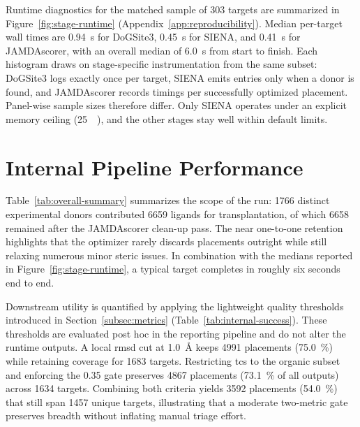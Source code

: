 

Runtime diagnostics for the matched sample of \num{303} targets are summarized in Figure~\ref{fig:stage-runtime} (Appendix~\ref{app:reproducibility}). Median per-target wall times are \SI{0.94}{\second} for DoGSite3, \SI{0.45}{\second} for SIENA, and \SI{0.41}{\second} for JAMDAscorer, with an overall median of \SI{6.0}{\second} from start to finish. Each histogram draws on stage-specific instrumentation from the same subset: DoGSite3 logs exactly once per target, SIENA emits entries only when a donor is found, and JAMDAscorer records timings per successfully optimized placement. Panel-wise sample sizes therefore differ. Only SIENA operates under an explicit memory ceiling (\SI{25}{\giga\byte}), and the other stages stay well within default limits.

\section{Internal Pipeline Performance}
\label{sec:results-internal}
Table~\ref{tab:overall-summary} summarizes the scope of the run: \num{1766} distinct experimental donors contributed \num{6659} ligands for transplantation, of which \num{6658} remained after the JAMDAscorer clean-up pass. The near one-to-one retention highlights that the optimizer rarely discards placements outright while still relaxing numerous minor steric issues. In combination with the medians reported in Figure~\ref{fig:stage-runtime}, a typical target completes in roughly six seconds end to end.



Downstream utility is quantified by applying the lightweight quality thresholds introduced in Section~\ref{subsec:metrics} (Table~\ref{tab:internal-success}). These thresholds are evaluated post hoc in the reporting pipeline and do not alter the runtime outputs. A local \gls{rmsd} cut at \SI{1.0}{\angstrom} keeps \num{4991} placements (\SI{75.0}{\percent}) while retaining coverage for \num{1683} targets. Restricting \gls{tcs} to the organic subset and enforcing the 0.35 gate preserves \num{4867} placements (\SI{73.1}{\percent} of all outputs) across \num{1634} targets. Combining both criteria yields \num{3592} placements (\SI{54.0}{\percent}) that still span \num{1457} unique targets, illustrating that a moderate two-metric gate preserves breadth without inflating manual triage effort.


